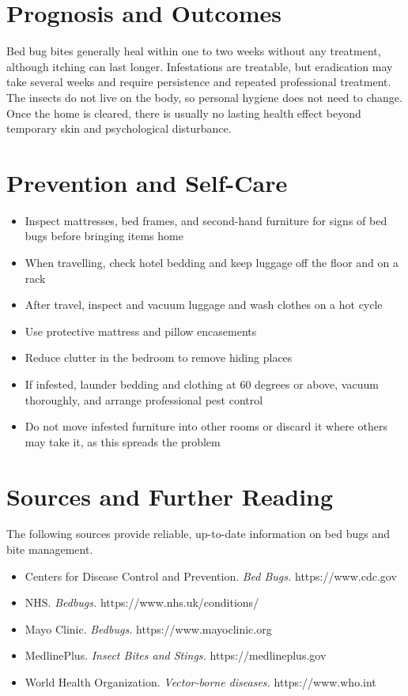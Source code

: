 \section*{Prognosis and Outcomes}
Bed bug bites generally heal within one to two weeks without any treatment, although itching can last longer. Infestations are treatable, but eradication may take several weeks and require persistence and repeated professional treatment. The insects do not live on the body, so personal hygiene does not need to change. Once the home is cleared, there is usually no lasting health effect beyond temporary skin and psychological disturbance.

\section*{Prevention and Self-Care}
\begin{itemize}
    \item Inspect mattresses, bed frames, and second-hand furniture for signs of bed bugs before bringing items home
    \item When travelling, check hotel bedding and keep luggage off the floor and on a rack
    \item After travel, inspect and vacuum luggage and wash clothes on a hot cycle
    \item Use protective mattress and pillow encasements
    \item Reduce clutter in the bedroom to remove hiding places
    \item If infested, launder bedding and clothing at 60 degrees or above, vacuum thoroughly, and arrange professional pest control
    \item Do not move infested furniture into other rooms or discard it where others may take it, as this spreads the problem
\end{itemize}

\section*{Sources and Further Reading}
The following sources provide reliable, up-to-date information on bed bugs and bite management.
\begin{itemize}
    \item Centers for Disease Control and Prevention. \textit{Bed Bugs.} https://www.cdc.gov
    \item NHS. \textit{Bedbugs.} https://www.nhs.uk/conditions/
    \item Mayo Clinic. \textit{Bedbugs.} https://www.mayoclinic.org
    \item MedlinePlus. \textit{Insect Bites and Stings.} https://medlineplus.gov
    \item World Health Organization. \textit{Vector-borne diseases.} https://www.who.int
\end{itemize}
